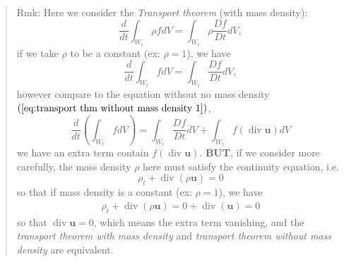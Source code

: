 \begin{quote}
	Rmk:
Here we consider the \textit{Transport theorem} (with mass density):
\begin{equation}
\frac{d}{dt}\int_{W_t} \rho f dV = \int_{W_t} \rho \frac{Df}{Dt} dV,
\end{equation}
if we take $\rho$ to be a constant (ex: $\rho =1$), we have
\begin{equation}
\frac{d}{dt}\int_{W_t} f dV = \int_{W_t} \frac{Df}{Dt} dV,
\end{equation}
however compare to the equation without no mass density  $(\ref{eq:transport thm without mass density 1})$​,
\begin{equation}
\frac{d}{dt}\left(\int_{W_t} fdV\right)
= \int_{W_t} \frac{Df}{Dt}dV + \int_{W_t}f(\operatorname{div}\textbf{u}) dV
\end{equation}
we have an extra term contain $f(\operatorname{div}\textbf{u})$. \textbf{BUT}, if  we consider more carefully, the mass density $\rho$ here must satisfy the continuity equation, i.e.
\begin{equation}
\rho_t + \operatorname{div}(\rho \textbf{u}) = 0
\end{equation}
so that if mass density is a constant (ex: $\rho = 1 $), we have
\begin{equation}
\begin{aligned}
\rho_t + \operatorname{div}(\rho \textbf{u}) = 0 + \operatorname{div}(\textbf{u}) = 0
\end{aligned}
\end{equation}
so that $\operatorname{div}\textbf{u} = 0$, which means the extra term vanishing, and the \textit{transport theorem with mass density} and \textit{transport theorem without mass density} are equivalent.
\end{quote}

